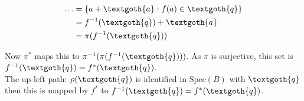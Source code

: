 \documentclass{article}
\begin{document}
\begin{equation*}
\begin{split}
  \dots & = \{ a + \textgoth{a}: f(a) \in \textgoth{q} \} \\
        & = f^{-1}(\textgoth{q}) + \textgoth{a} \\ 
        & = \pi(f^{-1}(\textgoth{q}))
\end{split}
\end{equation*}

\noindent
Now $\pi^*$ maps this to $\pi^{-1}(\pi(f^{-1}(\textgoth{q})))$. As $\pi$ is surjective, this set is $f^{-1}(\textgoth{q}) = f^*(\textgoth{q})$. \\
The up-left path: $\rho(\textgoth{q})$ is identified in $\text{Spec}(B)$ with $\textgoth{q}$ then this is mapped by $f^*$ to $f^{-1}(\textgoth{q}) = f^*(\textgoth{q})$. 
\end{document}
